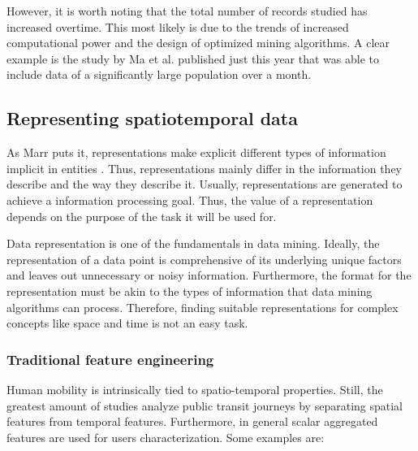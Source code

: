 \documentclass{article}
\begin{document}
However, it is worth noting that the total number of records studied has increased overtime. This most likely is due to the trends of increased computational power and the design of optimized mining algorithms. A clear example is the study by Ma et al. \cite{ma2017understanding} published just this year that was able to include data of a significantly large population over a month. 

\subsection{Representing spatiotemporal data}
\label{sec:representations}
As Marr puts it, representations make explicit different types of information implicit in entities \cite{marr1982computational}. Thus, representations mainly differ in the information they describe and the way they describe it. Usually, representations are generated to achieve a information processing goal. Thus, the value of a representation depends on the purpose of the task it will be used for. 

Data representation is one of the fundamentals in data mining. Ideally, the representation of a data point is comprehensive of its underlying unique factors and leaves out unnecessary or noisy information. Furthermore, the format for the representation must be akin to the types of information that data mining algorithms can process. Therefore, finding suitable representations for complex concepts like space and time is not an easy task.

\subsubsection{Traditional feature engineering}
Human mobility is intrinsically tied to spatio-temporal properties. Still, the greatest amount of studies analyze public transit journeys by separating spatial features from temporal features. Furthermore, in general scalar aggregated features are used for users characterization. Some examples are:
\end{document}
